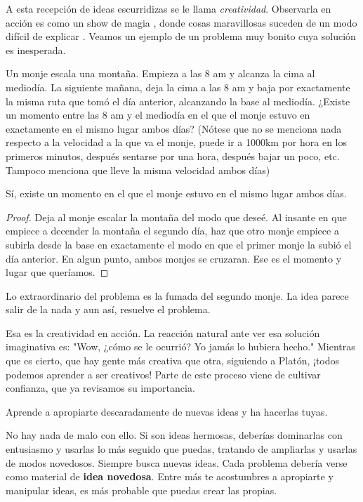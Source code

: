 A esta recepción de ideas escurridizas se le llama \textit{creatividad}. 
Observarla en acción es como un show de magia , donde cosas maravillosas 
suceden de un modo difícil de explicar . Veamos un ejemplo de un 
problema muy bonito cuya solución es inesperada.

\begin{example}
    Un monje escala una montaña. Empieza a las 8 am y alcanza la cima 
    al mediodía. La siguiente mañana, deja la cima a las 8 am y baja 
    por exactamente la misma ruta que tomó el día anterior, alcanzando 
    la base al mediodía. ¿Existe un momento entre las 8 am y el mediodía 
    en el que el monje estuvo en exactamente en el mismo lugar ambos días?
    (Nótese que no se menciona nada respecto a la velocidad a la que va 
    el monje, puede ir a 1000km por hora en los primeros minutos, después
    sentarse por una hora, después bajar un poco, etc. Tampoco menciona 
    que lleve la misma velocidad ambos días)
\end{example}

Sí, existe un momento en el que el monje estuvo en el mismo lugar 
ambos días.

\begin{proof}
    Deja al monje escalar la montaña del modo que deseé. Al insante en que 
    empiece a decender la montaña el segundo día, haz que otro monje 
    empiece a subirla desde la base en exactamente el modo en que el 
    primer monje la subió el día anterior. En algun punto, ambos monjes 
    se cruzaran. Ese es el momento y lugar que queríamos. 
\end{proof}

Lo extraordinario del problema es la fumada del segundo monje. La idea 
parece salir de la nada y aun así, resuelve el problema.

Esa es la creatividad en acción. La reacción natural ante ver esa solución
imaginativa es: "Wow, ¿cómo se le ocurrió? Yo jamás lo hubiera hecho." 
Mientras que es cierto, que hay gente más creativa que otra, siguiendo a 
Platón, ¡todos podemos aprender a ser creativos! Parte de este proceso 
viene de cultivar confianza, que ya revisamos su importancia.

\begin{moral}
    Aprende a apropiarte descaradamente de nuevas ideas y ha hacerlas 
    tuyas.
\end{moral}

No hay nada de malo con ello. Si son ideas hermosas, deberías 
dominarlas con entusiasmo y usarlas lo más seguido que puedas, tratando 
de ampliarlas y usarlas de modos novedosos. Siempre busca nuevas ideas. 
Cada problema debería verse como material de \textbf{idea novedosa}. 
Entre más te acostumbres a apropiarte y manipular ideas, es más 
probable que puedas crear las propias. 


